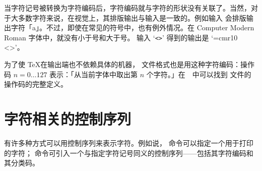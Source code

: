 \documentclass{book}
\begin{document}
当字符记号被转换为字符编码后，字符编码就与字符的形状没有关联了。当然，对于大多数字符来说，在视觉上，其排版输出与输入是一致的。例如输入  会排版输出字符「a」。不过，即使在常见的符号中，也有例外情况。在 Computer Modern Roman 字体中，就没有小于号和大于号。
%
输入 `\verb.<>.' 得到的输出是 `{\font\cmr=cmr10 \cmr<>}'。

为了使 \TeX 在输出端也不依赖具体的机器， 文件格式也是用这种字符编码：操作码 $n=0\ldots127$ 表示：「从当前字体中取出第 $n$ 个字符。」在~\cite{Knuth:TeXprogram}~中可以找到  文件的操作码的完整定义。

\section{字符相关的控制序列}

有许多种方式可以用控制序列来表示字符。例如说， 命令可以指定一个用于打印的字符； 命令可引入一个与指定字符记号同义的控制序列——包括其字符编码和其分类码。

\end{document}
